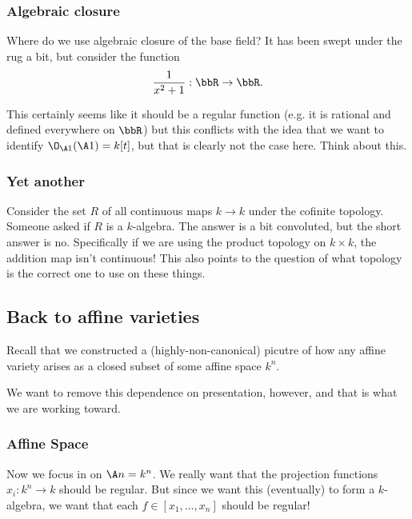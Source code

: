 \documentclass[12pt]{article}
\begin{document}
\subsubsection{Algebraic closure}
Where do we use algebraic closure of the base field? It has been swept under the rug a bit, but consider the function
\[\frac{1}{x^2+1}:\bbR\to \bbR.\]

This certainly seems like it should be a regular function (e.g. it is rational and defined everywhere on $\bbR$) but this 
conflicts with the idea that we want to identify $\O_{\A1}(\A1)=k[t]$, but that is clearly not the case here. Think about this.
\subsubsection{Yet another}\label{subsubsec:third}
Consider the set $R$ of all continuous maps $k\to k$ under the cofinite topology. Someone asked if $R$ is a $k$-algebra. The answer is 
a bit convoluted, but the short answer is no. Specifically if we are using the product topology on $k\times k$, the addition map isn't continuous! 
This also points to the question of what topology is the correct one to use on these things.

\subsection{Back to affine varieties}
Recall that we constructed a (highly-non-canonical) picutre of how any affine variety arises as a closed subset of some affine space $k^n$.

We want to remove this dependence on presentation, however, and that is what we are working toward.

\subsubsection{Affine Space}
Now we focus in on $\A n=k^n$. We really want that the projection functions $x_i:k^n\to k$ should be regular. But since we want this (eventually)
to form a $k$-algebra, we want that each $f\in[x_1,\dots,x_n]$ should be regular!
\end{document}
